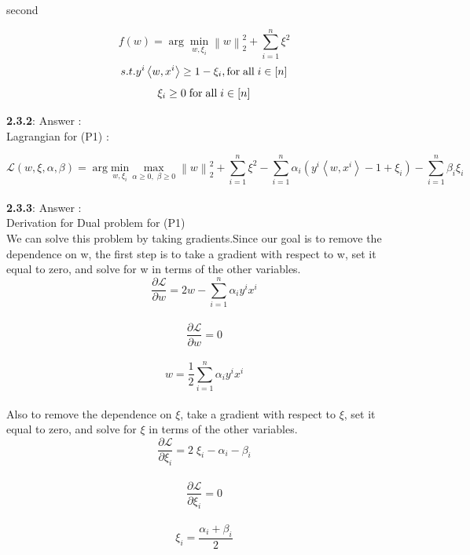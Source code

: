 \documentclass[a4paper,11pt]{article}
\begin{document}
\begin{mlsolution}
second
\end{mlsolution}

\begin{mlsolution}

\[
f(w) = \arg \underset{w, {\xi_{i} }}{\min} \left \| w \right \|_{2}^{2} + \sum_{i = 1}^{n} \xi^{2}
\]\[
\\
s.t. y^{i} \left \langle w, x^{i} \right \rangle \geq 1 - \xi_{i}, \text{for} \; \text{all} \; i \in [n]
\]\[\\
\xi_{i} \geq 0\; \text{for} \; \text{all} \; i \in [n]
\]

\textbf{2.3.2}: Answer :\\

Lagrangian for (P1) :

\[
\mathcal{L}(w, \xi, \alpha, \beta) = \arg \underset{w, {\xi_{i} }}{ \text{min} } \; \underset{\alpha\geq 0 ,\; \beta\geq0}{\text{max}} \; \left \| w \right \|_{2}^{2} + \sum_{i = 1}^{n} \xi^{2}
 - \sum_{i=1}^{n} \alpha_{i} \left ( y^{i} \left \langle w, x^{i} \right \rangle - 1 + \xi_{i} \right ) - \sum_{i=1}^{n}\beta_{i} \xi_{i}
\]\\

\textbf{2.3.3}: Answer :\\

Derivation for Dual problem for (P1)\\

We can solve this problem by taking gradients.Since our goal is to remove the dependence on w, the first step is to take a gradient with respect to w, set it equal to zero, and solve for w in terms of the other variables.\\
\[
\frac{\partial  \mathcal{L}}{\partial w} = 2w - \sum_{i=1}^{n} \alpha_{i}y^{i}x^{i} 
\]\\\[
\frac{\partial  \mathcal{L}}{\partial w}  = 0
\]\\\[
w = \frac{1}{2}\sum_{i=1}^{n} \alpha_{i}y^{i}x^{i} 
\]\\

Also to remove the dependence on $\xi$, take a gradient with respect to $\xi$, set it equal to zero, and solve for $\xi$ in terms of the other variables.\\

\[
\frac{\partial  \mathcal{L}}{\partial \xi_{i} } = 2\;\xi_{i} - \alpha_{i} - \beta_{i}
\]\\\[
\frac{\partial  \mathcal{L}}{\partial \xi_{i} } = 0
\]\\\[
\xi_{i} = \frac{\alpha_{i} + \beta_{i}}{2}
\]\\


\end{mlsolution}
\end{document}
